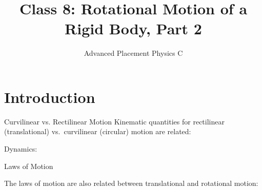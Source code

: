 \documentclass[12pt,compress,aspectratio=169]{beamer}
\title{Class 8: Rotational Motion of a Rigid Body, Part 2}
\subtitle{Advanced Placement Physics C}
\begin{document}
\begin{frame}
  \maketitle
\end{frame}



\section{Introduction}

\begin{frame}{Curvilinear vs. Rectilinear Motion}
  Kinematic quantities for rectilinear (translational) vs.\ curvilinear
  (circular) motion are related:

  \vspace{-.5in}{\Large
    \begin{align*}
      \vec r &\quad\rightarrow\quad \theta \\
      \vec v &\quad\rightarrow\quad \omega \\
      \vec a &\quad\rightarrow\quad \alpha
    \end{align*}
  }

  Dynamics:
  
  \vspace{-.5in}{\Large
    \begin{align*}
      m &\quad\rightarrow\quad I\\
      \vec F &\quad\rightarrow\quad \vec\tau\\
      \vec p=m\vec v &\quad\rightarrow\quad \vec L=I\omega
    \end{align*}
  }
\end{frame}



\begin{frame}{Laws of Motion}

  The laws of motion are also related between translational and rotational
  motion:
  
\end{frame}
\end{document}
